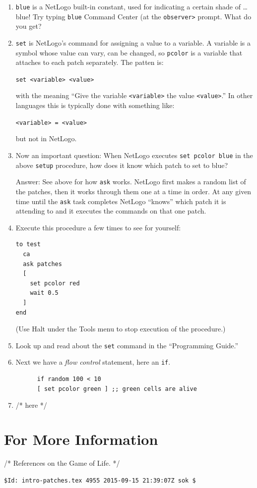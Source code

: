\begin{enumerate}
\item \texttt{blue} is a NetLogo built-in constant, used for indicating a certain shade of \ldots blue!  Try typing \texttt{blue} Command Center (at the \verb+observer>+ prompt. What do you get?

\item \texttt{set} is NetLogo's command for assigning a value to a variable. A variable is a symbol whose value can vary, can be changed, so \texttt{pcolor} is a variable that attaches to each patch separately.
The patten is:

\verb+set <variable> <value>+

\noindent with the meaning ``Give the variable \verb+<variable>+ the value \verb+<value>+.'' In other languages this is typically done with something like:

\verb+<variable> = <value>+

\noindent but not in NetLogo.

\item Now an important question: When NetLogo executes \texttt{set pcolor blue} in the above \texttt{setup} procedure, how does it know which patch to set to blue?

Answer: See above for how \texttt{ask} works. NetLogo first makes a random list of the patches, then it works through them one at a time in order. At any given time until the \texttt{ask} task completes NetLogo ``knows'' which patch it is attending to and it executes the commands on that one patch.

\item Execute this procedure a few times to see for yourself:
\begin{verbatim}
to test
  ca
  ask patches 
  [
    set pcolor red
    wait 0.5
  ]
end
\end{verbatim}
(Use Halt under the Tools menu to stop execution of the procedure.)
\item Look up and read about the \texttt{set} command in the ``Programming Guide.''
\item Next we have a \emph{flow control} statement, here an \texttt{if}.
\begin{verbatim}
      if random 100 < 10 
      [ set pcolor green ] ;; green cells are alive
      \end{verbatim}

\item /* here */
\end{enumerate}

\section{For More Information}

/* References on the Game of Life. */


\ifnum{}
\vfill
\noindent\verb+$Id: intro-patches.tex 4955 2015-09-15 21:39:07Z sok $+
\fi